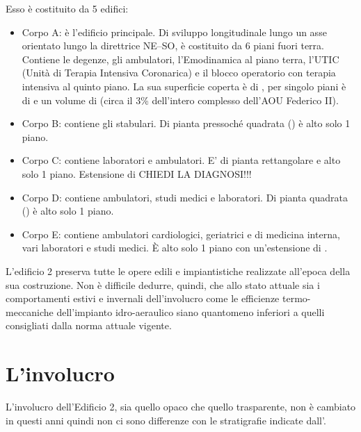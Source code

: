 Esso è costituito da 5 edifici:
\begin{itemize}
	\item Corpo A: è l'edificio principale. Di sviluppo longitudinale lungo un asse orientato lungo la direttrice NE--SO, è costituito da 6 piani fuori terra. Contiene le degenze, gli ambulatori, l'Emodinamica al piano terra, l'UTIC (Unità di Terapia Intensiva Coronarica) e il blocco operatorio con terapia intensiva al quinto piano. La sua superficie coperta è di , per singolo piani è di  e un volume di  (circa il 3\% dell'intero complesso dell'AOU Federico II).
	\item Corpo B: contiene gli stabulari. Di pianta pressoché quadrata () è alto solo 1 piano. 
	\item Corpo C: contiene laboratori e ambulatori. E' di pianta rettangolare e alto solo 1 piano. Estensione di  CHIEDI LA DIAGNOSI!!!
	\item Corpo D: contiene ambulatori, studi medici e laboratori. Di pianta quadrata () è alto solo 1 piano. 
	\item Corpo E: contiene ambulatori cardiologici, geriatrici e di medicina interna, vari laboratori e studi medici. È alto solo 1 piano con un'estensione di .
\end{itemize}

L'edificio 2 preserva tutte le opere edili e impiantistiche realizzate all'epoca della sua costruzione. Non è difficile dedurre, quindi, che allo stato attuale sia i comportamenti estivi e invernali dell'involucro come le efficienze termo-meccaniche dell'impianto idro-aeraulico siano quantomeno inferiori a quelli consigliati dalla norma attuale vigente. 

\section{L'involucro}
L'involucro dell'Edificio 2, sia quello opaco che quello trasparente, non è cambiato in questi anni quindi non ci sono differenze con le stratigrafie indicate dall'.

